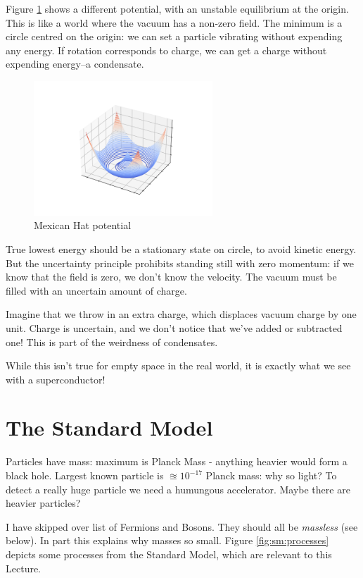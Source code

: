 \documentclass[]{article}
\begin{document}
Figure \ref{fig:mexican-hat} shows a different potential, with an unstable equilibrium at the origin. This is like a world where the vacuum has a non-zero field. The minimum is a circle centred on the origin: we can set a particle vibrating without expending any energy. If rotation corresponds to charge, we can get a charge without expending energy--a condensate.
\begin{figure}[H]
	\begin{center}
		\caption{Mexican Hat potential}\label{fig:mexican-hat}
		\includegraphics[width=0.6\textwidth]{mexican-hat}
	\end{center}
\end{figure}

True lowest energy should be a stationary state on circle, to avoid kinetic energy. But the uncertainty principle prohibits standing still with zero momentum: if we know that the field is zero, we don't know the velocity. The vacuum must be filled with an uncertain amount of charge.

Imagine that we throw in an extra charge, which displaces vacuum charge by one unit. Charge is uncertain, and we don't notice that we've added or subtracted one! This is part of the weirdness of condensates.

While this isn't true for empty space in the real world, it is exactly what we see with a superconductor!

\section{The Standard Model}

Particles have mass: maximum is Planck Mass - anything heavier would form a black hole. Largest known particle is $\approxeq 10^{-17}$ Planck mass: why so light? To detect a really huge particle we need a humungous accelerator. Maybe there are heavier particles?

I have skipped over list of Fermions and Bosons. They should all be \emph{massless} (see below). In part this explains why masses so small. Figure \ref{fig:sm:processes} depicts some processes from the Standard Model, which are relevant to this Lecture.
\end{document}

